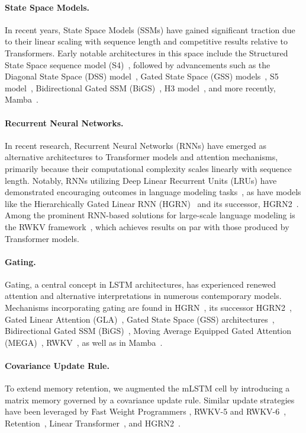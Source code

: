 \paragraph{State Space Models.} In recent years, State Space Models (SSMs) have gained significant traction due to their linear scaling with sequence length and competitive results relative to Transformers. Early notable architectures in this space include the Structured State Space sequence model (S4)~\citep{Gu:21}, followed by advancements such as the Diagonal State Space (DSS) model~\citep{Gupta:22}, Gated State Space (GSS) models~\citep{Mehta:22}, S5 model~\citep{Smith:22}, Bidirectional Gated SSM (BiGS)~\citep{Wang:22}, H3 model~\citep{Fu:23}, and more recently, Mamba~\citep{Gu:24arxiv}.

\paragraph{Recurrent Neural Networks.} In recent research, Recurrent Neural Networks (RNNs) have emerged as alternative architectures to Transformer models and attention mechanisms, primarily because their computational complexity scales linearly with sequence length. Notably, RNNs utilizing Deep Linear Recurrent Units (LRUs) have demonstrated encouraging outcomes in language modeling tasks~\citep{Orvieto:23, De:24arxiv}, as have models like the Hierarchically Gated Linear RNN (HGRN)~\citep{Qin:23} and its successor, HGRN2~\citep{Qin:24arxiv}. Among the prominent RNN-based solutions for large-scale language modeling is the RWKV framework~\citep{Peng:23arxivshort,Peng:24arxivshort}, which achieves results on par with those produced by Transformer models.

\paragraph{Gating.}
Gating, a central concept in LSTM architectures, has experienced renewed attention and alternative interpretations in numerous contemporary models. Mechanisms incorporating gating are found in HGRN~\citep{Qin:23}, its successor HGRN2~\citep{Qin:24arxiv}, Gated Linear Attention (GLA)~\citep{Yang:23arxiv}, Gated State Space (GSS) architectures~\citep{Mehta:22}, Bidirectional Gated SSM (BiGS)~\citep{Wang:22}, Moving Average Equipped Gated Attention (MEGA)~\citep{Ma:22}, RWKV~\citep{Peng:23arxivshort}, as well as in Mamba~\citep{Gu:24arxiv}.

\paragraph{Covariance Update Rule.} To extend memory retention, we augmented the mLSTM cell by introducing a matrix memory governed by a covariance update rule. Similar update strategies have been leveraged by Fast Weight Programmers \citep{Schmidhuber:92ncfastweights,Schlag:21}, RWKV-5 and RWKV-6~\citep{Peng:24arxivshort}, Retention~\citep{Sun:23arxiv}, Linear Transformer~\citep{Katharopoulos:20}, and HGRN2~\citep{Qin:24arxiv}.

